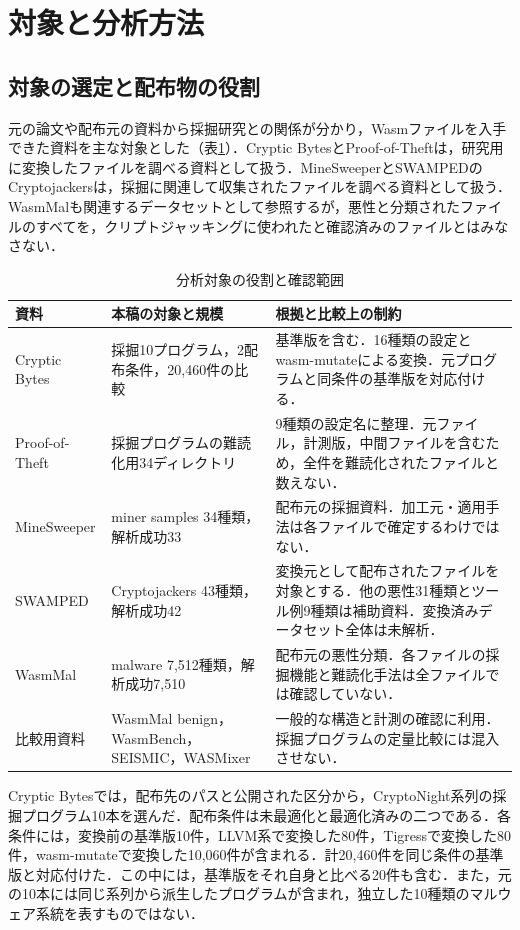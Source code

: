 \documentclass[submit,techrep]{ipsj}
\begin{document}
\section{対象と分析方法}
\subsection{対象の選定と配布物の役割}
元の論文や配布元の資料から採掘研究との関係が分かり，Wasmファイルを入手できた資料を主な対象とした（表\ref{tab:scope}）．Cryptic BytesとProof-of-Theftは，研究用に変換したファイルを調べる資料として扱う．MineSweeperとSWAMPEDのCryptojackersは，採掘に関連して収集されたファイルを調べる資料として扱う．WasmMalも関連するデータセットとして参照するが，悪性と分類されたファイルのすべてを，クリプトジャッキングに使われたと確認済みのファイルとはみなさない．
\begin{table}[t]
\caption{分析対象の役割と確認範囲}
\label{tab:scope}
\centering\small
\begin{tabular}{p{29mm}p{51mm}p{78mm}}
\hline
資料 & 本稿の対象と規模 & 根拠と比較上の制約 \\
\hline
Cryptic Bytes & 採掘10プログラム，2配布条件，20,460件の比較 & 基準版を含む．16種類の設定とwasm-mutateによる変換．元プログラムと同条件の基準版を対応付ける．\\
Proof-of-Theft & 採掘プログラムの難読化用34ディレクトリ & 9種類の設定名に整理．元ファイル，計測版，中間ファイルを含むため，全件を難読化されたファイルと数えない．\\
MineSweeper & miner samples 34種類，解析成功33 & 配布元の採掘資料．加工元・適用手法は各ファイルで確定するわけではない．\\
SWAMPED & Cryptojackers 43種類，解析成功42 & 変換元として配布されたファイルを対象とする．他の悪性31種類とツール例9種類は補助資料．変換済みデータセット全体は未解析．\\
WasmMal & malware 7,512種類，解析成功7,510 & 配布元の悪性分類．各ファイルの採掘機能と難読化手法は全ファイルでは確認していない．\\
比較用資料 & WasmMal benign，WasmBench，SEISMIC，WASMixer & 一般的な構造と計測の確認に利用．採掘プログラムの定量比較には混入させない．\\
\hline
\end{tabular}
\end{table}
Cryptic Bytesでは，配布先のパスと公開された区分から，CryptoNight系列の採掘プログラム10本を選んだ．配布条件は未最適化と最適化済みの二つである．各条件には，変換前の基準版10件，LLVM系で変換した80件，Tigressで変換した80件，wasm-mutateで変換した10,060件が含まれる．計20,460件を同じ条件の基準版と対応付けた．この中には，基準版をそれ自身と比べる20件も含む．また，元の10本には同じ系列から派生したプログラムが含まれ，独立した10種類のマルウェア系統を表すものではない．
\end{document}
